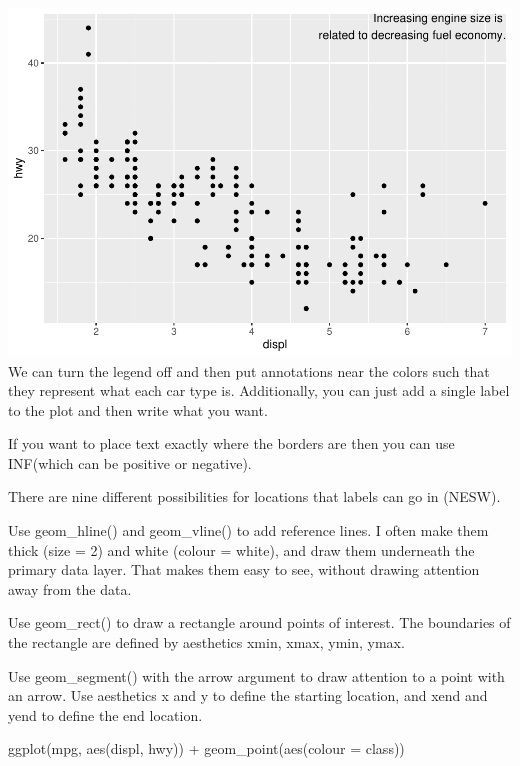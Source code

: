\documentclass[
]{article}
\newenvironment{Shaded}{\begin{snugshade}}{\end{snugshade}}
\newcommand{\AttributeTok}[1]{\textcolor[rgb]{0.77,0.63,0.00}{#1}}
\newcommand{\FunctionTok}[1]{\textcolor[rgb]{0.00,0.00,0.00}{#1}}
\newcommand{\NormalTok}[1]{#1}
\newcommand{\SpecialCharTok}[1]{\textcolor[rgb]{0.00,0.00,0.00}{#1}}
\begin{document}
\includegraphics{Journal_files/figure-latex/unnamed-chunk-53-3.pdf} We
can turn the legend off and then put annotations near the colors such
that they represent what each car type is. Additionally, you can just
add a single label to the plot and then write what you want.

If you want to place text exactly where the borders are then you can use
INF(which can be positive or negative).

There are nine different possibilities for locations that labels can go
in (NESW).

Use geom\_hline() and geom\_vline() to add reference lines. I often make
them thick (size = 2) and white (colour = white), and draw them
underneath the primary data layer. That makes them easy to see, without
drawing attention away from the data.

Use geom\_rect() to draw a rectangle around points of interest. The
boundaries of the rectangle are defined by aesthetics xmin, xmax, ymin,
ymax.

Use geom\_segment() with the arrow argument to draw attention to a point
with an arrow. Use aesthetics x and y to define the starting location,
and xend and yend to define the end location.

\begin{Shaded}
\begin{Highlighting}[]
\FunctionTok{ggplot}\NormalTok{(mpg, }\FunctionTok{aes}\NormalTok{(displ, hwy)) }\SpecialCharTok{+}
  \FunctionTok{geom\_point}\NormalTok{(}\FunctionTok{aes}\NormalTok{(}\AttributeTok{colour =}\NormalTok{ class))}
\end{Highlighting}
\end{Shaded}
\end{document}
